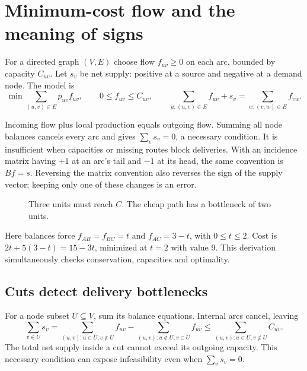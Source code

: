 \documentclass[11pt,a4paper]{article}
\begin{document}
\section{Minimum-cost flow and the meaning of signs}\label{sec:flow}
\begin{lecturecore}
  For a directed graph $(V,E)$ choose flow $f_{uv}\geq0$ on each arc, bounded by
  capacity $C_{uv}$. Let $s_v$ be net supply: positive at a source and negative
  at a demand node. The model is
  \[
    \min\sum_{(u,v)\in E}p_{uv}f_{uv},\qquad 0\leq f_{uv}\leq C_{uv},\qquad
    \sum_{u:(u,v)\in E}f_{uv}+s_v=\sum_{w:(v,w)\in E}f_{vw}.
  \]
\end{lecturecore}
Incoming flow plus local production equals outgoing flow. Summing all node
balances cancels every arc and gives $\sum_v s_v=0$, a necessary condition.
It is insufficient when capacities or missing routes block deliveries.
With an incidence matrix having $+1$ at an arc's tail and $-1$ at its head,
the same convention is $Bf=s$. Reversing the matrix convention also reverses
the sign of the supply vector; keeping only one of these changes is an error.

\begin{figure}[H]
  \centering
  \caption{Three units must reach $C$. The cheap path has a bottleneck of two units.}
  \label{fig:flow}
\end{figure}
Here balances force $f_{AB}=f_{BC}=t$ and $f_{AC}=3-t$, with $0\leq t\leq2$.
Cost is $2t+5(3-t)=15-3t$, minimized at $t=2$ with value $9$.
This derivation simultaneously checks conservation, capacities and optimality.

\subsection{Cuts detect delivery bottlenecks}\label{sec:cuts}
For a node subset $U\subseteq V$, sum its balance equations. Internal arcs
cancel, leaving
\[
  \sum_{v\in U}s_v
  =\sum_{(u,v):u\in U,v\notin U}f_{uv}
  -\sum_{(u,v):u\notin U,v\in U}f_{uv}
  \leq\sum_{(u,v):u\in U,v\notin U}C_{uv}.
\]
The total net supply inside a cut cannot exceed its outgoing capacity.
This necessary condition can expose infeasibility even when $\sum_v s_v=0$.
\end{document}
